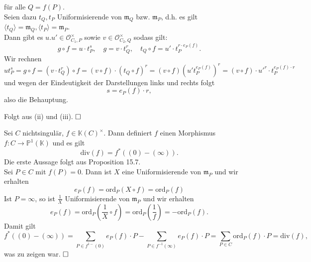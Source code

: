 \documentclass[11pt]{book}
\theoremstyle{nonumberbreak}
\newenvironment{pr}[1][]{\ifthenelse{\equal{#1}{}}{\proof}{\proof[#1]}\rm}{\endproof}
\newenvironment{bemdefin}[1][]{\ifthenelse{\equal{#1}{}}{\bemdefini}{\bemdefini[#1]}\rm}{\endbemdefini}
\newenvironment{folg}[1][]{\ifthenelse{\equal{#1}{}}{\folger}{\folger[#1]}\rm}{\endfolger}
\begin{document}
\begin{spacing}{1.3}
\begin{bemdefin}
\begin{pr}
\begin{compactenum}
für alle $Q= f(P)$. \\
Seien dazu $t_Q, t_P$ Uniformisierende von $\mathfrak{m}_Q$ bzw. $\mathfrak{m}_P$, d.h. es gilt $\langle t_Q \rangle = \mathfrak{m}_Q, \langle t_P \rangle = \mathfrak{m}_P$.\\ Dann gibt es $u.u' \in \mathcal{O}_{C_1, P}^{\times}$ sowie $v \in \mathcal{O}_{C_2, Q}^{\times}$ sodass gilt:
$$g \circ f = u \cdot t_P^s, \quad g = v \cdot t_Q^r, \quad t_Q \circ f = u' \cdot t_P^{r \cdot e_P(f)}.$$
Wir rechnen
$$u t_P^s = g \circ f  = ( v \cdot t_Q^r) \circ f = (v \circ f) \cdot ( t_Q \circ f)^r = (v \circ f) \left( u't_P^{e_P(f)}\right)^r = (v \circ f) \cdot u'^r \cdot t_P^{e_P(f) \cdot r}$$
und wegen der Eindeutigkeit der Darstellungen links und rechts folgt
$$s= e_P(f) \cdot r,$$
also die Behauptung.
\item Folgt aus (ii) und (iii). $\hfill \Box$

\end{compactenum}
\end{pr}
\end{bemdefin}

\begin{folg} %

Sei $C$ nichtsingulär, $f \in \mathbb{K}(C)^{\times}$. Dann definiert $f$ einen Morphismus $f: C \longrightarrow \mathbb{P}^1(\mathbb{K})$ und es gilt
$$\textrm{div}(f)= f^{*}( (0) - (\infty) ).$$
\begin{pr}
Die erste Aussage folgt aus Proposition 15.7.\\
Sei $P \in C$ mit $f(P)=0$. Dann ist $X$ eine Uniformisierende von $\mathfrak{m}_P$ und wir erhalten
$$e_P(f)= \textrm{ord}_P(X \circ f ) = \textrm{ord}_P(f)$$
Ist $P = \infty$, so ist $\frac{1}{X}$ Uniformisierende von $\mathfrak{m}_P$ und wir erhalten
$$e_P(f) = \textrm{ord}_P\left(\frac{1}{X} \circ f \right) = \textrm{ord}_P\left( \frac{1}{f} \right) = - \textrm{ord}_P(f).$$
Damit gilt
$$f^{*} ( (0) - (\infty)) = \sum_{P\in f^{1-}(0)} e_P(f) \cdot P -\sum_{P \in f^{-1}(\infty)} e_P(f) \cdot P = \sum_{P \in C} \textrm{ord}_P(f) \cdot P = \textrm{div}(f), $$
was zu zeigen war. $\hfill \Box$
\end{pr}
\end{folg}

\begin{bemdefin} %


\end{bemdefin}
\end{spacing}
\end{document}
